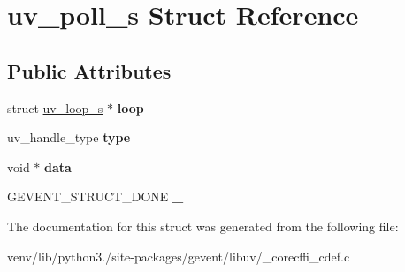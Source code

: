 \hypertarget{structuv__poll__s}{}\section{uv\+\_\+poll\+\_\+s Struct Reference}
\label{structuv__poll__s}
\subsection*{Public Attributes}
\begin{DoxyCompactItemize}
\item 
\mbox{\label{structuv__poll__s_abb20356fbf7551995bf869030836d390}} 
struct \hyperlink{structuv__loop__s}{uv\+\_\+loop\+\_\+s} $\ast$ {\bfseries loop}
\item 
\mbox{\label{structuv__poll__s_acd0e62ff57084bf5e643abe84d218804}} 
uv\+\_\+handle\+\_\+type {\bfseries type}
\item 
\mbox{\label{structuv__poll__s_a2b91cc676a66bb93d91eff76b5e64877}} 
void $\ast$ {\bfseries data}
\item 
\mbox{\label{structuv__poll__s_a826885fffb751756f63ef3357e780d70}} 
G\+E\+V\+E\+N\+T\+\_\+\+S\+T\+R\+U\+C\+T\+\_\+\+D\+O\+NE {\bfseries \+\_\+}
\end{DoxyCompactItemize}


The documentation for this struct was generated from the following file\+:\begin{DoxyCompactItemize}
\item 
venv/lib/python3./site-\/packages/gevent/libuv/\+\_\+corecffi\+\_\+cdef.\+c\end{DoxyCompactItemize}
